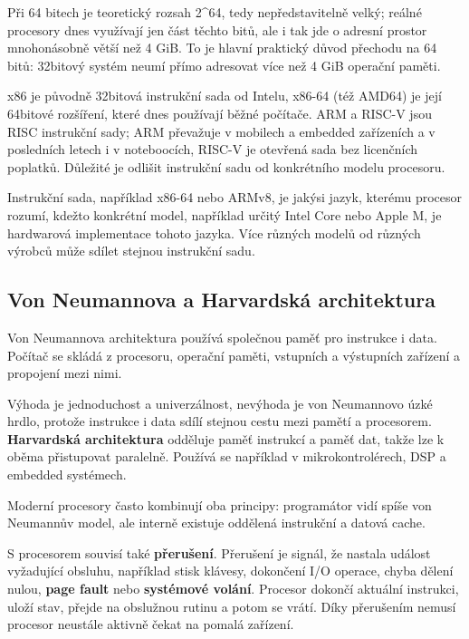 Při 64 bitech je teoretický rozsah 2\textasciicircum{}64, tedy nepředstavitelně velký; reálné procesory dnes využívají jen část těchto bitů, ale i tak jde o adresní prostor mnohonásobně větší než 4 GiB. To je hlavní praktický důvod přechodu na 64 bitů: 32bitový systém neumí přímo adresovat více než 4 GiB operační paměti.

x86 je původně 32bitová instrukční sada od Intelu, x86-64 (též AMD64) je její 64bitové rozšíření, které dnes používají běžné počítače. ARM a RISC-V jsou RISC instrukční sady; ARM převažuje v mobilech a embedded zařízeních a v posledních letech i v noteboocích, RISC-V je otevřená sada bez licenčních poplatků. Důležité je odlišit instrukční sadu od konkrétního modelu procesoru.

Instrukční sada, například x86-64 nebo ARMv8, je jakýsi jazyk, kterému procesor rozumí, kdežto konkrétní model, například určitý Intel Core nebo Apple M, je hardwarová implementace tohoto jazyka. Více různých modelů od různých výrobců může sdílet stejnou instrukční sadu.

\subsection*{Von Neumannova a Harvardská architektura}

Von Neumannova architektura používá společnou paměť pro instrukce i data. Počítač se skládá z procesoru, operační paměti, vstupních a výstupních zařízení a propojení mezi nimi.

Výhoda je jednoduchost a univerzálnost, nevýhoda je von Neumannovo úzké hrdlo, protože instrukce i data sdílí stejnou cestu mezi pamětí a procesorem. \textbf{Harvardská architektura} odděluje paměť instrukcí a paměť dat, takže lze k oběma přistupovat paralelně. Používá se například v mikrokontrolérech, DSP a embedded systémech.

Moderní procesory často kombinují oba principy: programátor vidí spíše von Neumannův model, ale interně existuje oddělená instrukční a datová cache.

S procesorem souvisí také \textbf{přerušení}. Přerušení je signál, že nastala událost vyžadující obsluhu, například stisk klávesy, dokončení I/O operace, chyba dělení nulou, \textbf{page fault} nebo \textbf{systémové volání}. Procesor dokončí aktuální instrukci, uloží stav, přejde na obslužnou rutinu a potom se vrátí. Díky přerušením nemusí procesor neustále aktivně čekat na pomalá zařízení.


